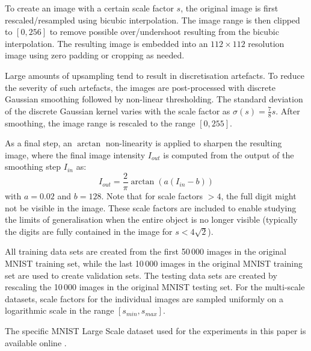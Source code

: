 \documentclass[twocolumn,runningheads]{svjour3}
\begin{document}
To create an image with a certain scale factor $s$, the original image
is first rescaled/resampled using bicubic interpolation. The image
range is then clipped to $[0, 256]$ to remove possible over/undershoot
resulting from the bicubic interpolation. The resulting image is
embedded into an $112 \times 112$ resolution image using zero padding
or cropping as needed. 
	
Large amounts of upsampling tend to result in discretisation
artefacts. To reduce the severity of such artefacts, the images are
post-processed with discrete Gaussian smoothing \cite{Lin90-PAMI}
followed by non-linear thresholding. The standard deviation of the
discrete Gaussian kernel varies with the scale factor as $\sigma(s) =
\frac{7}{8}s$. After smoothing, the image range is rescaled to the
range $[0, 255]$.
	
As a final step, an $\arctan$ non-linearity is applied to sharpen the
resulting image, where the final image intensity $I_{out}$ is computed
from the output of the smoothing step $I_{in}$ as:  
\begin{equation}
  I_{out} = \frac{2}{\pi}\arctan(a(I_{in} - b))
\end{equation}	
with $a=0.02$  and $b = 128$. 
Note that for scale factors $>4$, the full digit might not be visible
in the image. These scale factors are included to enable studying the
limits of generalisation when the entire object is no longer visible
(typically the digits are fully contained in the image for $s <
4\sqrt{2}$).
	
All training data sets are created from the first 50\,000 images in
the original MNIST training set, while the last 10\,000 images in the
original MNIST training set are used to create validation sets. The
testing data sets are created by rescaling the 10\,000 images in the
original MNIST testing set. For the multi-scale datasets, scale factors
for the individual images are sampled uniformly on a logarithmic scale
in the range $[s_{min}, s_{max}]$.
	
The specific MNIST Large Scale dataset used for the experiments in this paper is
available online \cite{JanLin20-MNISTLargeScale}.	
	


\end{document}
